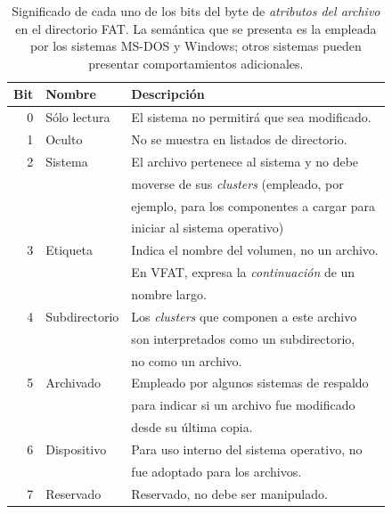 \documentclass[11pt,fleqn]{book} %
\begin{document}
\begin{table}[htb]
\caption{Significado de cada uno de los bits del byte de \emph{atributos del archivo} en el directorio FAT. La semántica que se presenta es la empleada por los sistemas MS-DOS y Windows; otros sistemas pueden presentar comportamientos adicionales.} \label{FS_artributos_fat}
\begin{center}
\begin{tabular}{rll}
 Bit  &  Nombre         &  Descripción                                      \\
\hline
   0  &  Sólo lectura   &  El sistema no permitirá que sea modificado.      \\
   1  &  Oculto         &  No se muestra en listados de directorio.         \\
   2  &  Sistema        &  El archivo pertenece al sistema y no debe        \\
      &                 &  moverse de sus \emph{clusters} (empleado, por    \\
      &                 &  ejemplo, para los componentes a cargar para      \\
      &                 &  iniciar al sistema operativo)                    \\
   3  &  Etiqueta       &  Indica el nombre del volumen, no un archivo.     \\
      &                 &  En VFAT, expresa la \emph{continuación} de un    \\
      &                 &  nombre largo.                                    \\
   4  &  Subdirectorio  &  Los \emph{clusters} que componen a este archivo  \\
      &                 &  son interpretados como un subdirectorio,         \\
      &                 &  no como un archivo.                              \\
   5  &  Archivado      &  Empleado por algunos sistemas de respaldo        \\
      &                 &  para indicar si un archivo fue modificado        \\
      &                 &  desde su última copia.                           \\
   6  &  Dispositivo    &  Para uso interno del sistema operativo, no       \\
      &                 &  fue adoptado para los archivos.                  \\
   7  &  Reservado      &  Reservado, no debe ser manipulado.               \\
\end{tabular}
\end{center}
\end{table}
\end{document}
